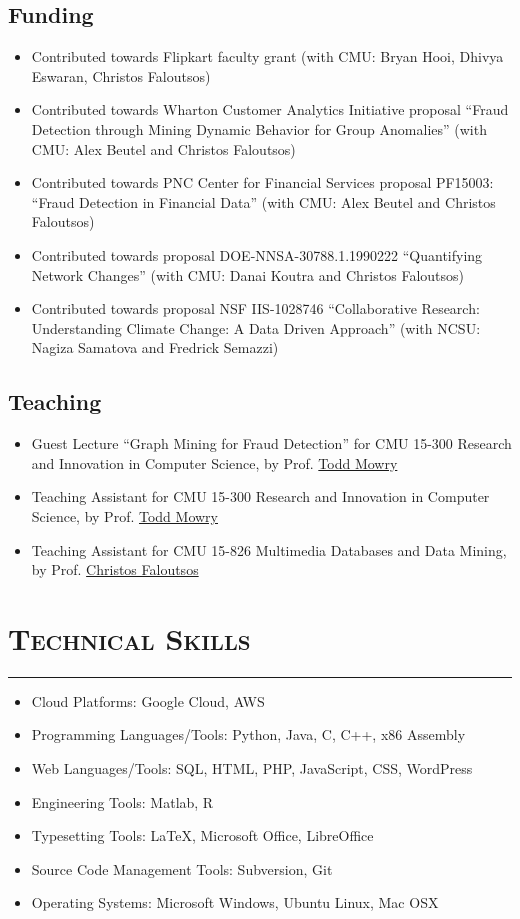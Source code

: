 \documentclass{article}
\newcommand{\HRule}{\rule{\linewidth}{0.5mm}}
\begin{document}
\subsection*{\bf {Funding}}
\begin{itemize}
\item Contributed towards Flipkart faculty grant (with CMU: Bryan Hooi, Dhivya Eswaran, Christos Faloutsos)
\item Contributed towards Wharton Customer Analytics Initiative proposal ``Fraud Detection through Mining Dynamic Behavior for Group Anomalies'' (with CMU: Alex Beutel and Christos Faloutsos)
\item Contributed towards PNC Center for Financial Services proposal PF15003: ``Fraud Detection in Financial Data'' (with CMU: Alex Beutel and Christos Faloutsos)
\item Contributed towards proposal DOE-NNSA-30788.1.1990222 ``Quantifying Network Changes'' (with CMU: Danai Koutra and Christos Faloutsos)
\item Contributed towards proposal NSF IIS-1028746 ``Collaborative Research:  Understanding Climate Change: A Data Driven Approach'' (with NCSU: Nagiza Samatova and Fredrick Semazzi)
\end{itemize}

\subsection*{\bf {Teaching}}
\begin{itemize}
\item Guest Lecture ``Graph Mining for Fraud Detection'' for CMU 15-300 Research and Innovation in Computer Science, by Prof. \href{http://www.cs.cmu.edu/~tcm}{Todd Mowry}
\item Teaching Assistant for CMU 15-300 Research and Innovation in Computer Science, by Prof. \href{http://www.cs.cmu.edu/~tcm}{Todd Mowry}
\item Teaching Assistant for CMU 15-826 Multimedia Databases and Data Mining, by Prof. \href{http://www.cs.cmu.edu/~christos}{Christos Faloutsos}
\end{itemize}

\section*{\bf \textsc{Technical Skills}}
\vspace{-5mm}\HRule
\begin{itemize}
\item Cloud Platforms: Google Cloud, AWS
\item Programming Languages/Tools: Python, Java, C, C++, x86 Assembly
\item Web Languages/Tools: SQL, HTML, PHP, JavaScript, CSS, WordPress
\item Engineering Tools: Matlab, R
\item Typesetting Tools: \LaTeX, Microsoft Office, LibreOffice
\item Source Code Management Tools: Subversion, Git
\item Operating Systems: Microsoft Windows, Ubuntu Linux, Mac OSX
\end{itemize}
\end{document}
